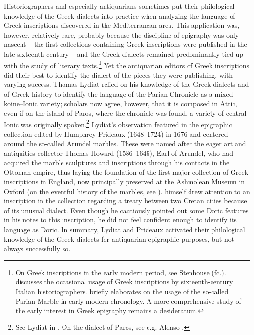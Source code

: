 Historiographers and especially antiquarians sometimes put their philological knowledge of the Greek dialects into practice when analyzing the language of Greek inscriptions discovered in the Mediterranean area. This application was, however, relatively rare, probably because the discipline of epigraphy was only nascent – the first collections containing Greek inscriptions were published in the late sixteenth century – and the Greek dialects remained predominantly tied up with the study of literary texts.\footnote{On Greek inscriptions in the early modern period, see Stenhouse (fc.). \citet{Stenhouse2005} discusses the occasional usage of Greek inscriptions by sixteenth-century Italian historiographers. \citet{Liddel2014} briefly elaborates on the usage of the so-called Parian Marble in early modern chronology. A more comprehensive study of the early interest in Greek epigraphy remains a desideratum.} Yet the antiquarian editors of Greek inscriptions did their best to identify the dialect of the pieces they were publishing, with varying success. Thomas Lydiat relied on his knowledge of the Greek dialects and of Greek history to identify the language of the Parian Chronicle as a mixed koine–Ionic variety; scholars now agree, however, that it is composed in Attic, even if on the island of Paros, where the chronicle was found, a variety of central Ionic was originally spoken.\footnote{See Lydiat in \citet[\textsc{ii}.116–117]{Prideaux1676}. On the dialect of Paros, see e.g. Alonso \citet[531]{Deniz2018}.} Lydiat’s observation featured in the epigraphic collection edited by Humphrey Prideaux (1648–1724) in 1676 and centered around the so-called Arundel marbles. These were named after the eager art and antiquities collector Thomas Howard (1586–1646), Earl of Arundel, who had acquired the marble sculptures and inscriptions through his contacts in the Ottoman empire, thus laying the foundation of the first major collection of Greek inscriptions in England, now principally preserved at the Ashmolean Museum in Oxford (on the eventful history of the marbles, see \citealt{Vickers2006}). \citet[\textsc{i.}a.1\textsc{\textsuperscript{v}}, 123]{Prideaux1676} himself drew attention to an inscription in the collection regarding a treaty between two Cretan cities because of its unusual dialect. Even though he cautiously pointed out some Doric features in his notes to this inscription, he did not feel confident enough to identify its language as Doric. In summary, Lydiat and Prideaux activated their philological knowledge of the Greek dialects for antiquarian-epigraphic purposes, but not always successfully so.

